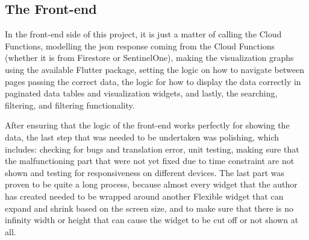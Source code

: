 \begin{multicols}{2}
      \section{The Front-end}

      In the front-end side of this project, it is just a matter of calling the Cloud Functions, modelling the \acrshort{json} response
      coming from the Cloud Functions (whether it is from Firestore or SentinelOne), making the visualization graphs using the available
      Flutter package, setting the logic on how to navigate between pages passing the correct data, the logic for how to display the data
      correctly in paginated data tables and visualization widgets, and lastly, the searching, filtering, and filtering functionality.

      After ensuring that the logic of the front-end works perfectly for showing the data, the last step that was needed to be undertaken
      was polishing, which includes: checking for bugs and translation error, unit testing, making sure that the malfunctioning part that
      were not yet fixed due to time constraint are not shown and testing for responsiveness on different devices. The last part was
      proven to be quite a long process, because almost every widget that the author has created needed to be wrapped around another
      Flexible widget that can expand and shrink based on the screen size, and to make sure that there is no infinity width or height
      that can cause the widget to be cut off or not shown at all.




\end{multicols}
